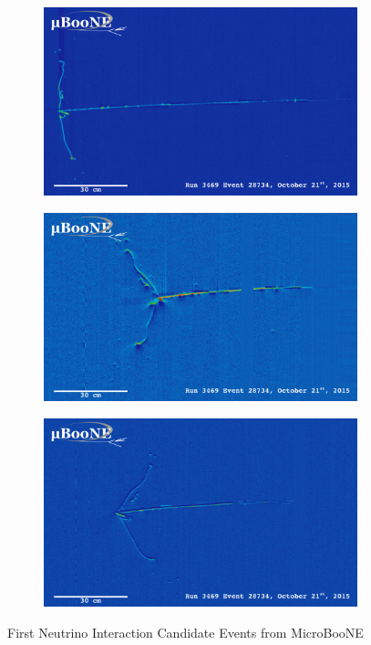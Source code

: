 \begin{figure}[htp!]
\centering
	\begin{subfigure}[b]{.8\textwidth}
	\includegraphics[width=\textwidth]{figs/first_neutrino_pdfs/run3469_subrun574_event28734_col.pdf}
	\end{subfigure}
	\quad
	\begin{subfigure}[b]{.8\textwidth}
	\includegraphics[width=\textwidth]{figs/first_neutrino_pdfs/run3469_subrun574_event28734_ind0.pdf}
	\end{subfigure}
	\quad
	\begin{subfigure}[b]{.8\textwidth}
	\includegraphics[width=\textwidth]{figs/first_neutrino_pdfs/run3469_subrun574_event28734_ind1.pdf}
	\end{subfigure}
	\quad
\caption{First Neutrino Interaction Candidate Events from MicroBooNE}
\label{fig:2dimage}
\end{figure}

